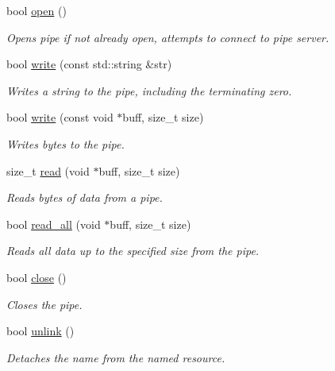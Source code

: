 \begin{DoxyCompactItemize}
bool \hyperlink{classcpen333_1_1process_1_1windows_1_1pipe_a25b30161d315cfd4ad1b9fdaf55d56b0}{open} ()
\begin{DoxyCompactList}\small\item\em Opens pipe if not already open, attempts to connect to pipe server. \end{DoxyCompactList}\item 
bool \hyperlink{classcpen333_1_1process_1_1windows_1_1pipe_a633e73bc0c412b17a9c536251a746500}{write} (const std\+::string \&str)
\begin{DoxyCompactList}\small\item\em Writes a string to the pipe, including the terminating zero. \end{DoxyCompactList}\item 
bool \hyperlink{classcpen333_1_1process_1_1windows_1_1pipe_a072e8bded1b6f0a45683875ed3be1aa2}{write} (const void $\ast$buff, size\+\_\+t size)
\begin{DoxyCompactList}\small\item\em Writes bytes to the pipe. \end{DoxyCompactList}\item 
size\+\_\+t \hyperlink{classcpen333_1_1process_1_1windows_1_1pipe_a3cb456794637be1845cdeca693dc27d0}{read} (void $\ast$buff, size\+\_\+t size)
\begin{DoxyCompactList}\small\item\em Reads bytes of data from a pipe. \end{DoxyCompactList}\item 
bool \hyperlink{classcpen333_1_1process_1_1windows_1_1pipe_a4aafcae5f14f971f112ec00601f55601}{read\+\_\+all} (void $\ast$buff, size\+\_\+t size)
\begin{DoxyCompactList}\small\item\em Reads all data up to the specified size from the pipe. \end{DoxyCompactList}\item 
bool \hyperlink{classcpen333_1_1process_1_1windows_1_1pipe_a6d01b3a84c6184ba02e9825003386d20}{close} ()
\begin{DoxyCompactList}\small\item\em Closes the pipe. \end{DoxyCompactList}\item 
bool \hyperlink{classcpen333_1_1process_1_1windows_1_1pipe_abe0bc707040aa7e82ed41c26cc4c93c1}{unlink} ()
\begin{DoxyCompactList}\small\item\em Detaches the name from the named resource. \end{DoxyCompactList}\end{DoxyCompactItemize}
